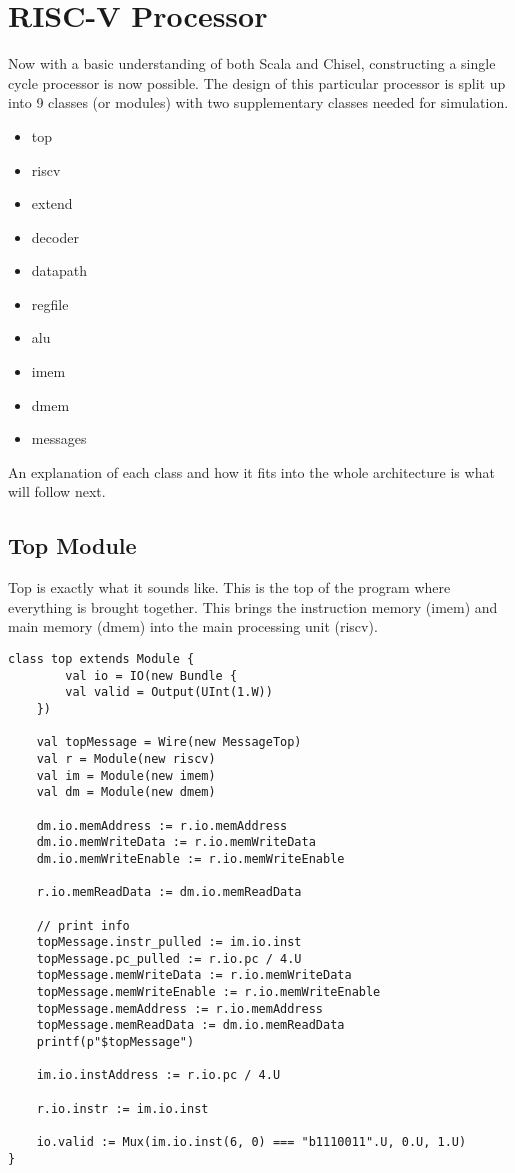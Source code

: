 \documentclass[12pt, letterpaper]{report}
\begin{document}
\chapter{RISC-V Processor}
Now with a basic understanding of both Scala and Chisel, constructing a single cycle processor is now possible.
The design of this particular processor is split up into 9 classes (or modules)
with two supplementary classes needed for simulation.
\begin{itemize}
   \item top
   \item riscv
   \item extend
   \item decoder
   \item datapath
   \item regfile
   \item alu
   \item imem
   \item dmem
   \item messages
\end{itemize}
An explanation of each class and how it fits into the whole architecture is what will follow next.



\section{Top Module}
Top is exactly what it sounds like. This is the top of the program where everything is brought together. This brings the instruction
memory (imem) and main memory (dmem) into the main processing unit (riscv).

\begin{lstlisting}[style=scala]
class top extends Module {
		val io = IO(new Bundle {
		val valid = Output(UInt(1.W))
	})
	
	val topMessage = Wire(new MessageTop)
	val r = Module(new riscv)
	val im = Module(new imem)
	val dm = Module(new dmem)
	
	dm.io.memAddress := r.io.memAddress
	dm.io.memWriteData := r.io.memWriteData
	dm.io.memWriteEnable := r.io.memWriteEnable
	
	r.io.memReadData := dm.io.memReadData
	
	// print info
	topMessage.instr_pulled := im.io.inst
	topMessage.pc_pulled := r.io.pc / 4.U
	topMessage.memWriteData := r.io.memWriteData
	topMessage.memWriteEnable := r.io.memWriteEnable 
	topMessage.memAddress := r.io.memAddress
	topMessage.memReadData := dm.io.memReadData
	printf(p"$topMessage")
	
	im.io.instAddress := r.io.pc / 4.U
	
	r.io.instr := im.io.inst
	
	io.valid := Mux(im.io.inst(6, 0) === "b1110011".U, 0.U, 1.U)
}
\end{lstlisting}
\end{document}
